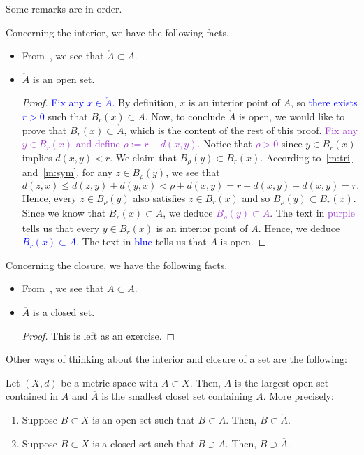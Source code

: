 Some remarks are in order.
\begin{rem}
	\label{rem:int_clos}
	Concerning the interior, we have the following facts.
	\begin{itemize}
		\item From~, we see that $\mathring{A} \subset A$.
		\item $\mathring{A}$ is an open set.
		\begin{proof}
			\textcolor{blue}{Fix any $x\in \mathring{A}$.} By definition, $x$ is an interior point of $A$, so \textcolor{blue}{there exists $r>0$} such that $B_r(x) \subset A$. Now, to conclude $\mathring{A}$ is open, we would like to prove that $B_r(x)\subset \mathring{A}$, which is the content of the rest of this proof. \textcolor{DarkOrchid}{Fix any $y \in B_r(x)$ and define $\rho:= r - d(x,y)$.} Notice that \textcolor{DarkOrchid}{$\rho>0$} since $y \in B_r(x)$ implies $d(x,y) < r$. We claim that $B_\rho(y) \subset B_r(x)$. According to~\ref{m:tri} and~\ref{m:sym}, for any $z \in B_\rho(y)$, we see that
			\[
			d(z,x) \le d(z,y) + d(y,x) < \rho + d(x,y) = r - d(x,y) + d(x,y) = r.
			\]
			Hence, every $z\in B_\rho(y)$ also satisfies $z\in B_r(x)$ and so $B_\rho(y) \subset B_r(x)$. Since we know that $B_r(x) \subset A$, we deduce \textcolor{DarkOrchid}{$B_\rho(y)\subset A$}. The text in \textcolor{DarkOrchid}{purple} tells us that every $y\in B_r(x)$ is an interior point of $A$. Hence, we deduce \textcolor{blue}{$B_r(x) \subset \mathring{A}$.} The text in \textcolor{blue}{blue} tells us that $\mathring{A}$ is open.
		\end{proof}
	\end{itemize}
	Concerning the closure, we have the following facts.
	\begin{itemize}
		\item From~, we see that $A \subset \overline{A}$.
		\item $\overline{A}$ is a closed set.
		\begin{proof}
			This is left as an exercise.
		\end{proof}
	\end{itemize}
\end{rem}
Other ways of thinking about the interior and closure of a set are the following:
\begin{lemma}
	\label{lem:int_large}
	Let $(X,d)$ be a metric space with $A\subset X$. Then, $\mathring{A}$ is the largest open set contained in $A$ and $\overline{A}$ is the smallest closet set containing $A$. More precisely:
	\begin{enumerate}
		\item \label{int_large} Suppose $B\subset X$ is an open set such that $B \subset A$. Then, $B\subset \mathring{A}$.
		\item \label{clos_small} Suppose $B\subset X$ is a closed set such that $B \supset A$. Then, $B \supset \overline{A}$.
	\end{enumerate}
\end{lemma}
